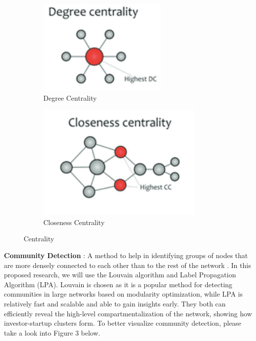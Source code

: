 \documentclass[a4paper,11pt]{article}
\begin{document}
\begin{figure}[ht]
\centering
\begin{subfigure}[b]{0.35\textwidth}
    \includegraphics[width=\textwidth]{Degree.png}
    \caption{Degree Centrality}
    \label{fig:image1}
\end{subfigure}
\hfill
\begin{subfigure}[b]{0.35\textwidth}
    \includegraphics[width=\textwidth]{Closeness.png}
    \caption{Closeness Centrality}
    \label{fig:image2}
\end{subfigure}
\caption{Centrality}
\label{fig:doubleimage}
\end{figure}

\textbf{Community Detection} : A method to help in identifying groups of nodes that are more densely connected to each other than to the rest of the network \cite{albert2019a}. In this proposed research, we will use the Louvain algorithm and Label Propagation Algorithm (LPA). Louvain is chosen as it is a popular method for detecting communities in large networks based on modularity optimization, while LPA is relatively fast and scalable and able to gain insights early. They both can efficiently reveal the high-level compartmentalization of the network, showing how investor-startup clusters form. To better visualize community detection, please take a look into Figure 3 below.
\end{document}

